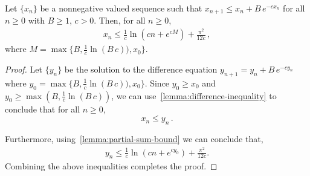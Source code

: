 \begin{lemma}
Let $\{x_n\}$ be a nonnegative valued sequence such that $x_{n+1} \le x_n + B \, e^{-cx_n}$ for all $n \ge 0$ with $B \geq 1$, $c > 0$. Then, for all $n \ge 0$, 
\begin{align*}
x_n \le  \frac1{c} \ln(c n + e^{c M} ) + \frac{\pi^2}{12c} \,,
\end{align*}
where $M = \max\{B, \frac{1}{c} \ln (B \,c)), x_{0} \}$. 
\label{lemma:partial-sum-combination}    
\end{lemma}
\begin{proof}
Let $\{y_n\}$ be the solution to the difference equation $y_{n+1} = y_n + B \, e^{-cy_n}$ where $y_0 = \max\{B, \frac{1}{c} \ln (B \,c)), x_{0} \}$. Since $y_0 \geq x_0$ and $y_0 \ge \max(B,\frac{1}{c}\ln (B \, c))$, we can use~\cref{lemma:difference-inequality} to conclude that for all $n \ge 0$, 
\[
x_n \le y_n \,.
\] 

Furthermore, using~\cref{lemma:partial-sum-bound} we can conclude that, 
\begin{align*}
y_n \leq \frac{1}{c} \ln(c n + e^{c y_0} ) + \frac{\pi^2}{12c}.
\end{align*} 
Combining the above inequalities completes the proof. 
\end{proof}




